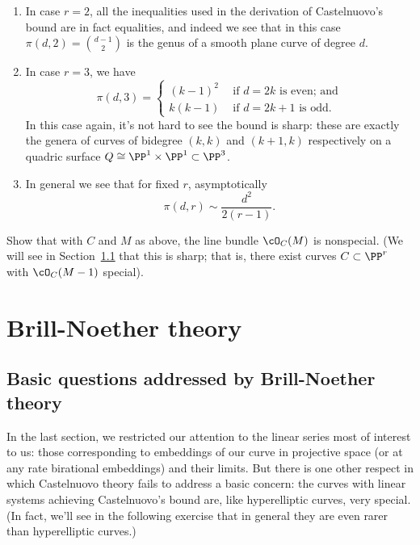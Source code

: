 \begin{enumerate}
\item In case $r=2$, all the inequalities used in the derivation of Castelnuovo's bound are in fact equalities, and indeed we see that in this case $\pi(d,2) = \binom{d-1}{2}$ is the genus of a smooth plane curve of degree $d$.

\item In case $r=3$, we have
$$
\pi(d,3) =
\begin{cases}
\left( k - 1 \right)^2 &\text{ if $d=2k$ is even; and} \\
k(k-1) &\text{ if $d=2k+1$ is odd.}
\end{cases}
$$
In this case again, it's not hard to see the bound is sharp: these are exactly the genera of curves of bidegree $(k,k)$ and $(k+1,k)$ respectively on a quadric surface $Q \cong \PP^1 \times \PP^1 \subset \PP^3$.
\item In general we see that for fixed $r$, asymptotically
$$
\pi(d,r) \sim \frac{d^2}{2(r-1)}.
$$
\end{enumerate}


\begin{exercise}
Show that with $C$ and $M$ as above, the line bundle $\cO_C(M)$ is nonspecial. (We will see in Section~\ref{} that this is sharp; that is, there exist curves $C \subset \PP^r$ with $\cO_C(M-1)$ special).
\end{exercise}


\section{Brill-Noether theory}

\subsection{Basic questions addressed by Brill-Noether theory}

In the last section, we restricted our attention to the linear series most of interest to us: those corresponding to embeddings of our curve in projective space (or at any rate birational embeddings) and their limits. But there is one other respect in which Castelnuovo theory fails to address a basic concern: the curves with linear systems achieving Castelnuovo's bound are, like hyperelliptic curves, very special. (In fact, we'll see in the following exercise that in general they are even rarer than hyperelliptic curves.) 

